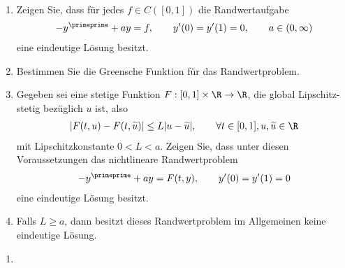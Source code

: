 \begin{exercise}
\leavevmode \\
\begin{enumerate}[label = \textbf{\alph*)}]
  \item Zeigen Sie, dass für jedes $f \in C([0,1])$ die Randwertaufgabe
  \begin{align*}
    -y^{\primeprime} + ay = f, \qquad y^{\prime}(0) = y^{\prime}(1) = 0, \qquad a \in (0,\infty)
  \end{align*}
  eine eindeutige Lösung besitzt.
  \item Bestimmen Sie die Greensche Funktion für das Randwertproblem.
  \item Gegeben sei eine stetige Funktion $F: [0,1] \times \R \to \R$, die
  global Lipschitz-stetig bezüglich $u$ ist, also
  \begin{align*}
    |F(t,u) - F(t,\widetilde{u})| \leq L|u - \widetilde{u}|, \qquad
    \forall t \in [0,1], u , \widetilde{u} \in \R
  \end{align*}
  mit Lipschitzkonstante $0 < L < a$. Zeigen Sie, dass unter diesen Voraussetzungen
  das nichtlineare Randwertproblem
  \begin{align*}
    -y^{\primeprime} + ay = F(t,y), \qquad y^{\prime}(0) = y^{\prime}(1) = 0
  \end{align*}
  eine eindeutige Lösung besitzt.
  \item Falls $L \geq a$, dann besitzt dieses Randwertproblem im Allgemeinen keine
  eindeutige Lösung.
\end{enumerate}
\end{exercise}
\begin{solution}
\begin{enumerate}[label = \textbf{\alph*)}]
  \item
\end{enumerate}
\end{solution}
